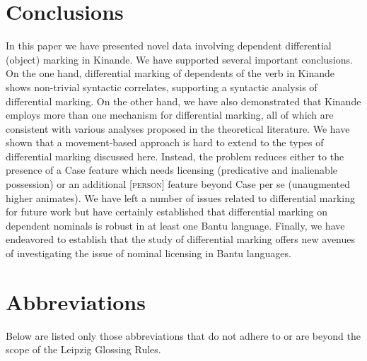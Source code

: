 \documentclass[output=paper]{langscibook}
\begin{document}
\section{Conclusions}\label{sec:schneider:section6Conclusion}

In this paper we have presented novel data involving dependent differential (object) marking in Kinande. We have supported several important conclusions. On the one hand, differential marking of dependents of the verb in Kinande shows non-trivial syntactic correlates, supporting a syntactic analysis of differential marking. On the other hand, we have also demonstrated that Kinande employs more than one mechanism for differential marking, all of which are consistent with various analyses proposed in the theoretical literature. We have shown that a movement-based approach is hard to extend to the types of differential marking discussed here. Instead, the problem reduces either to the presence of a Case feature which needs licensing (predicative and inalienable possession) or an additional \textsc{[person]} feature beyond Case per se (unaugmented higher animates). We have left a number of issues related to differential marking for future work but have certainly established that differential marking on dependent nominals is robust in at least one Bantu language. Finally, we have endeavored to establish that the study of differential marking offers new avenues of investigating the issue of nominal licensing in Bantu languages. 

\section*{Abbreviations}

Below are listed only those abbreviations that do not adhere to or are beyond the scope of the Leipzig Glossing Rules.
\end{document}
